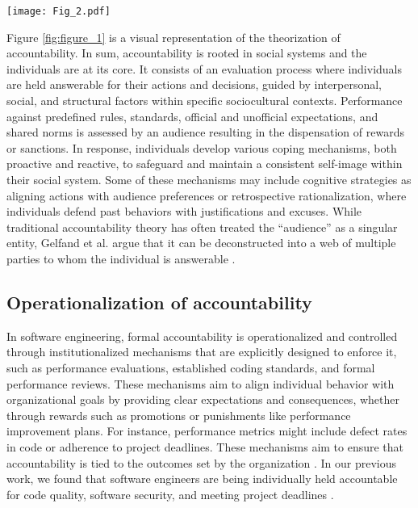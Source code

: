 \begin{figure*}[t!]

    \centering
    \texttt{[image: Fig\_2.pdf]}

    \caption{The Dynamics of Accountability in Social Systems}%
    \label{fig:figure_1}
\end{figure*}

Figure \ref{fig:figure_1} is a visual representation of the theorization of accountability. In sum, accountability is rooted in social systems and the individuals are at its core. It consists of an evaluation process where individuals are held answerable for their actions and decisions, guided by interpersonal, social, and structural factors within specific sociocultural contexts. Performance against predefined rules, standards, official and unofficial expectations, and shared norms is assessed by an audience resulting in the dispensation of rewards or sanctions. In response, individuals develop various coping mechanisms, both proactive and reactive, to safeguard and maintain a consistent self-image within their social system. Some of these mechanisms may include cognitive strategies as aligning actions with audience preferences or retrospective rationalization, where individuals defend past behaviors with justifications and excuses. While traditional accountability theory has often treated the ``audience'' as a singular entity, Gelfand et al. argue that it can be deconstructed into a web of multiple parties to whom the individual is answerable \citep{gelfand2004culture}.

\subsection{Operationalization of accountability}

In software engineering, formal accountability is operationalized and controlled through institutionalized mechanisms that are explicitly designed to enforce it, such as performance evaluations, established coding standards, and formal performance reviews. These mechanisms aim to align individual behavior with organizational goals by providing clear expectations and consequences, whether through rewards such as promotions or punishments like performance improvement plans. For instance, performance metrics might include defect rates in code or adherence to project deadlines. These mechanisms aim to ensure that accountability is tied to the outcomes set by the organization \citep{alami2024understanding}. In our previous work, we found that software engineers are being individually held accountable for code quality, software security, and meeting project deadlines \citep{alami2024understanding}.


